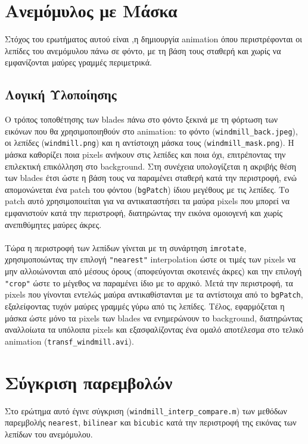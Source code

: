 \documentclass[12pt]{article}
\begin{document}
\section{Ανεμόμυλος με Μάσκα}
Στόχος του ερωτήματος αυτού είναι ,η δημιουργία animation όπου περιστρέφονται οι λεπίδες του ανεμόμυλου πάνω σε φόντο, με τη βάση τους σταθερή και χωρίς να εμφανίζονται μαύρες γραμμές περιμετρικά.
\subsection{Λογική Υλοποίησης}
Ο τρόπος τοποθέτησης των blades πάνω στο φόντο ξεκινά με τη φόρτωση των εικόνων που θα χρησιμοποιηθούν στο animation: το φόντο (\texttt{windmill\_back.jpeg}), οι λεπίδες (\texttt{windmill.png}) και η αντίστοιχη μάσκα τους (\texttt{windmill\_mask.png}). Η μάσκα καθορίζει ποια pixels ανήκουν στις λεπίδες και ποια όχι, επιτρέποντας την επιλεκτική επικόλληση στο background. 
Στη συνέχεια υπολογίζεται η ακριβής θέση των blades έτσι ώστε η βάση τους να παραμένει σταθερή κατά την περιστροφή, ενώ απομονώνεται ένα patch του φόντου (\texttt{bgPatch}) ίδιου μεγέθους με τις λεπίδες. Το patch αυτό χρησιμοποιείται για να αντικαταστήσει τα μαύρα pixels που μπορεί να εμφανιστούν κατά την περιστροφή, διατηρώντας την εικόνα ομοιογενή και χωρίς ανεπιθύμητες μαύρες άκρες. \\ \\
Τώρα η περιστροφή των λεπίδων γίνεται με τη συνάρτηση \texttt{imrotate}, χρησιμοποιώντας την επιλογή \texttt{"nearest"} interpolation ώστε οι τιμές των pixels να μην αλλοιώνονται από μέσους όρους (αποφεύγονται σκοτεινές άκρες) και την επιλογή \texttt{"crop"} ώστε το μέγεθος να παραμένει ίδιο με το αρχικό. 
Μετά την περιστροφή, τα pixels που γίνονται εντελώς μαύρα αντικαθίστανται με τα αντίστοιχα από το \texttt{bgPatch}, εξαλείφοντας τυχόν μαύρες γραμμές γύρω από τις λεπίδες. Τέλος, εφαρμόζεται η μάσκα ώστε μόνο τα pixels των blades να ενημερώνουν το background, διατηρώντας αναλλοίωτα τα υπόλοιπα pixels και εξασφαλίζοντας ένα ομαλό αποτέλεσμα στο τελικό animation (\texttt{transf\_windmill.avi}).

\section{Σύγκριση παρεμβολών}
Στο ερώτημα αυτό έγινε σύγκριση  (\texttt{windmill\_interp\_compare.m}) των μεθόδων παρεμβολής \texttt{nearest}, \texttt{bilinear} και \texttt{bicubic} κατά την περιστροφή της εικόνας των λεπίδων του ανεμόμυλου.
\end{document}
